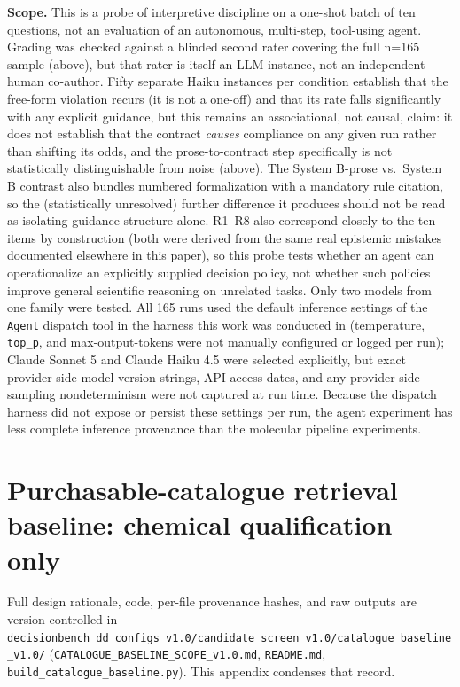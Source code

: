\documentclass{article}
\begin{document}
\textbf{Scope.} This is a probe of interpretive discipline on a one-shot batch of ten questions, not an evaluation of an autonomous, multi-step, tool-using agent. Grading was checked against a blinded second rater covering the full n=165 sample (above), but that rater is itself an LLM instance, not an independent human co-author. Fifty separate Haiku instances per condition establish that the free-form violation recurs (it is not a one-off) and that its rate falls significantly with any explicit guidance, but this remains an associational, not causal, claim: it does not establish that the contract \emph{causes} compliance on any given run rather than shifting its odds, and the prose-to-contract step specifically is not statistically distinguishable from noise (above). The System B-prose vs.\ System B contrast also bundles numbered formalization with a mandatory rule citation, so the (statistically unresolved) further difference it produces should not be read as isolating guidance structure alone. R1--R8 also correspond closely to the ten items by construction (both were derived from the same real epistemic mistakes documented elsewhere in this paper), so this probe tests whether an agent can operationalize an explicitly supplied decision policy, not whether such policies improve general scientific reasoning on unrelated tasks. Only two models from one family were tested. All 165 runs used the default inference settings of the \texttt{Agent} dispatch tool in the harness this work was conducted in (temperature, \texttt{top\_p}, and max-output-tokens were not manually configured or logged per run); Claude Sonnet 5 and Claude Haiku 4.5 were selected explicitly, but exact provider-side model-version strings, API access dates, and any provider-side sampling nondeterminism were not captured at run time. Because the dispatch harness did not expose or persist these settings per run, the agent experiment has less complete inference provenance than the molecular pipeline experiments.

\FloatBarrier
\section{Purchasable-catalogue retrieval baseline: chemical qualification only}
\label{app:j}

Full design rationale, code, per-file provenance hashes, and raw outputs are version-controlled in \texttt{decisionbench\_dd\_configs\_v1.0/candidate\_screen\_v1.0/catalogue\_baseline\_v1.0/} (\texttt{CATALOGUE\_BASELINE\_SCOPE\_v1.0.md}, \texttt{README.md}, \texttt{build\_catalogue\_baseline.py}). This appendix condenses that record.
\end{document}
